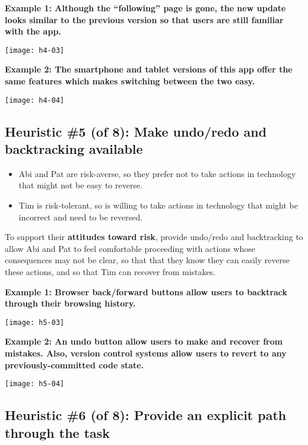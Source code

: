 \spacer
\noindent\textbf{Example 1: Although the ``following'' page is gone, the new update looks similar to the previous version so that users are still familiar with the app.}
\begin{center}
\noindent\texttt{[image: h4-03]}
\end{center}

\noindent\textbf{Example 2: The smartphone and tablet versions of this app offer the same features which makes switching between the two easy.}
\begin{center}
\noindent\texttt{[image: h4-04]}
\end{center}

\subsection{Heuristic \#5 (of 8): Make undo/redo and backtracking available}

\begin{itemize}
\item Abi and Pat are risk-averse, so they prefer not to take actions in technology that might not be easy to reverse.
\item Tim is risk-tolerant, so is willing to take actions in technology that might be incorrect and need to be reversed.
\end{itemize}

To support their \textbf{attitudes toward risk}, provide undo/redo and backtracking to allow Abi and Pat to feel comfortable proceeding with actions whose consequences may not be clear, so that that they know they can easily reverse these actions, and so that Tim can recover from mistakes.

\spacer
\noindent\textbf{Example 1: Browser back/forward buttons allow users to backtrack through their browsing history.}\\
\begin{center}
\noindent\texttt{[image: h5-03]}
\end{center}

\noindent\textbf{Example 2: An undo button allow users to make and recover from mistakes. Also, version control systems allow users to revert to any previously-committed code state.}\\
\begin{center}
\noindent\texttt{[image: h5-04]}
\end{center}

\subsection{Heuristic \#6 (of 8): Provide an explicit path through the task}

